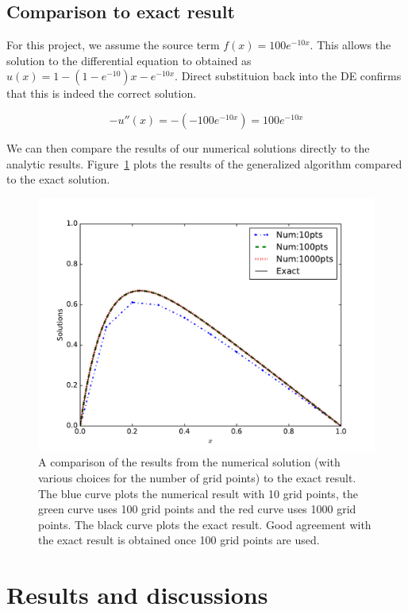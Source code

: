 \documentclass[10pt,showpacs,preprintnumbers,footinbib,amsmath,amssymb,aps,prl,twocolumn,groupedaddress,superscriptaddress,showkeys]{revtex4-1}
\begin{document}
\subsection{Comparison to exact result}

For this project, we assume the source term $f(x) = 100 e ^{-10x}$.
This allows the solution to the differential equation to obtained as
$u(x) = 1 - (1 - e^{-10})x - e^{-10x}$. Direct substituion back into
the DE confirms that this is indeed the correct solution.

\begin{equation*}
	- u''(x) = - (-100 e^{-10x}) = 100 e^{-10x}
\end{equation*}

We can then compare the results of our numerical solutions directly
to the analytic results. Figure~\ref{fig:compexact} plots the results
of the generalized algorithm compared to the exact solution.

\begin{figure}
\centering
	\includegraphics{figures/sols.pdf}
	\caption{A comparison of the results from the numerical solution
	(with various choices for the number of grid points) to the exact
	result. The blue curve plots the numerical result with 10 grid
	points, the green curve uses 100 grid points and the red curve
	uses 1000 grid points. The black curve plots the exact result.
	Good agreement with the exact result is obtained once 100 grid
	points are used.}
	\label{fig:compexact}
\end{figure}

\section{Results and discussions}
\end{document}
